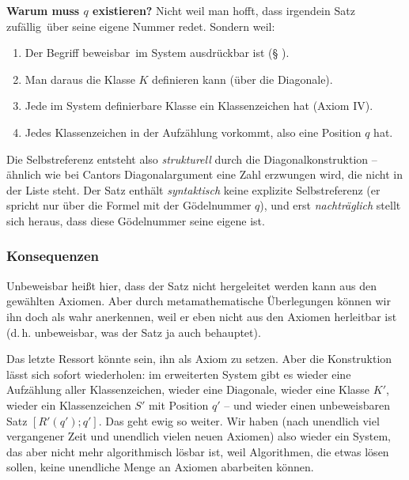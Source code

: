 \textbf{Warum muss $q$ existieren?} Nicht weil man hofft, dass irgendein Satz
\frq zufällig\flq\ über seine eigene Nummer redet. Sondern weil:
\begin{enumerate}
	\item Der Begriff \frq beweisbar\flq\ im System ausdrückbar ist (§ ).
	\item Man daraus die Klasse $K$ definieren kann (über die Diagonale).
	\item Jede im System definierbare Klasse ein Klassenzeichen hat (Axiom IV).
	\item Jedes Klassenzeichen in der Aufzählung vorkommt, also eine Position $q$ hat.
\end{enumerate}

Die Selbstreferenz entsteht also \textit{strukturell} durch die Diagonalkonstruktion --
ähnlich wie bei Cantors Diagonalargument eine Zahl erzwungen wird, die nicht in der
Liste steht. Der Satz enthält \textit{syntaktisch} keine explizite Selbstreferenz
(er spricht nur über \frq die Formel mit der Gödelnummer $q$\flq), und erst
\textit{nachträglich} stellt sich heraus, dass diese Gödelnummer seine eigene
ist.

\subsubsection*{Konsequenzen}

Unbeweisbar heißt hier, dass der Satz nicht hergeleitet werden kann aus den gewählten
Axiomen. Aber durch metamathematische Überlegungen können wir ihn doch als wahr anerkennen,
weil er eben nicht aus den Axiomen herleitbar ist (d.\,h. unbeweisbar, was der
Satz ja auch behauptet).

Das letzte Ressort könnte sein, ihn als Axiom zu setzen. Aber die Konstruktion lässt
sich sofort wiederholen: im erweiterten System gibt es wieder eine Aufzählung aller
Klassenzeichen, wieder eine Diagonale, wieder eine Klasse $K'$, wieder ein
Klassenzeichen $S'$ mit Position $q'$ -- und wieder einen unbeweisbaren Satz
$[R'(q'); q']$.
Das geht ewig so weiter. Wir haben (nach unendlich viel
vergangener Zeit und unendlich vielen neuen Axiomen) also wieder ein System,
das aber nicht mehr algorithmisch lösbar ist, weil Algorithmen, die etwas
lösen sollen, keine unendliche Menge an Axiomen abarbeiten können.

